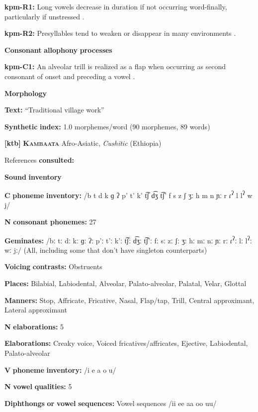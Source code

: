 \textbf{kpm-R1:}  Long vowels decrease in duration if not occurring word-finally, particularly if unstressed \citep[33]{Olsen2014}.

\textbf{kpm-R2:} Presyllables tend to weaken or disappear in many environments \citep[31]{Olsen2014}.

\textbf{Consonant} \textbf{allophony} \textbf{processes}

\textbf{kpm-C1:} An alveolar trill is realized as a flap when occurring as second consonant of onset and preceding a vowel \citep[24]{Olsen2014}.

\textbf{Morphology}

\textbf{Text:} “Traditional village work” \citep[106-107]{Olsen2014}

\textbf{Synthetic} \textbf{index:} 1.0 morphemes/word (90 morphemes, 89 words)

\textbf{[ktb]}   \textbf{\textsc{Kambaata}}  Afro-Asiatic, \textit{Cushitic} (Ethiopia)

References \textbf{consulted:} \citet{Treis2008}

\textbf{Sound} \textbf{inventory}

\textbf{C} \textbf{phoneme} \textbf{inventory:} /b t d k ɡ ʔ p’ t’ k’ t͡ʃ d͡ʒ t͡ʃ’ f s z ʃ ʒː h m n ɲː r ɾ\textsuperscript{ʔ} l l\textsuperscript{ʔ} w j/

\textbf{N} \textbf{consonant} \textbf{phonemes:} 27

\textbf{Geminates:} /bː tː dː kː ɡː ʔː p’ː t’ː k’ː t͡ʃː d͡ʒː t͡ʃ’ː fː sː zː ʃː ʒː hː mː nː ɲː rː ɾ\textsuperscript{ʔ}ː lː l\textsuperscript{ʔ}ː wː jː/ (All, including some that don’t have singleton counterparts)

\textbf{Voicing} \textbf{contrasts:} Obstruents

\textbf{Places:} Bilabial, Labiodental, Alveolar, Palato-alveolar, Palatal, Velar, Glottal

\textbf{Manners:} Stop, Affricate, Fricative, Nasal, Flap/tap, Trill, Central approximant, Lateral approximant

\textbf{N} \textbf{elaborations:} 5

\textbf{Elaborations:} Creaky voice, Voiced fricatives/affricates, Ejective, Labiodental, Palato-alveolar

\textbf{V} \textbf{phoneme} \textbf{inventory:} /i e a o u/

\textbf{N} \textbf{vowel} \textbf{qualities:} 5

\textbf{Diphthongs} \textbf{or} \textbf{vowel} \textbf{sequences:} Vowel sequences /ii ee aa oo uu/

